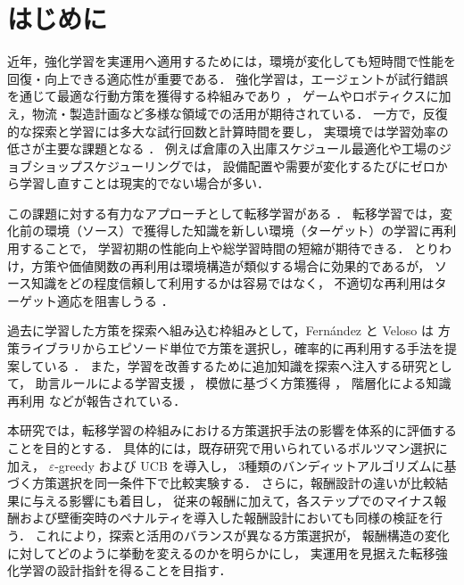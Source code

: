 \section{はじめに}
近年，強化学習を実運用へ適用するためには，環境が変化しても短時間で性能を回復・向上できる適応性が重要である．
強化学習は，エージェントが試行錯誤を通じて最適な行動方策を獲得する枠組みであり
\cite{SuttonBarto1998,WatkinsDayan1992}，
ゲームやロボティクスに加え，物流・製造計画など多様な領域での活用が期待されている．
一方で，反復的な探索と学習には多大な試行回数と計算時間を要し，
実環境では学習効率の低さが主要な課題となる
\cite{Thrun1995}．
例えば倉庫の入出庫スケジュール最適化や工場のジョブショップスケジューリングでは，
設備配置や需要が変化するたびにゼロから学習し直すことは現実的でない場合が多い．

この課題に対する有力なアプローチとして転移学習がある
\cite{TaylorWhitesonStone2007}．
転移学習では，変化前の環境（ソース）で獲得した知識を新しい環境（ターゲット）の学習に再利用することで，
学習初期の性能向上や総学習時間の短縮が期待できる．
とりわけ，方策や価値関数の再利用は環境構造が類似する場合に効果的であるが，
ソース知識をどの程度信頼して利用するかは容易ではなく，
不適切な再利用はターゲット適応を阻害しうる
\cite{TaylorKuhlmannStone2008}．

過去に学習した方策を探索へ組み込む枠組みとして，Fern\'andez と Veloso は
方策ライブラリからエピソード単位で方策を選択し，確率的に再利用する手法を提案している
\cite{Fernandez2006}．
また，学習を改善するために追加知識を探索へ注入する研究として，
助言ルールによる学習支援
\cite{MaclinShavlik1996}，
模倣に基づく方策獲得
\cite{NicolescuMataric2003}，
階層化による知識再利用
\cite{BartoMahadevan2003,KonidarisBarto2007}
などが報告されている．

本研究では，転移学習の枠組みにおける方策選択手法の影響を体系的に評価することを目的とする．
具体的には，既存研究で用いられているボルツマン選択に加え，
$\varepsilon$-greedy および UCB を導入し，
3種類のバンディットアルゴリズムに基づく方策選択を同一条件下で比較実験する．
さらに，報酬設計の違いが比較結果に与える影響にも着目し，
従来の報酬に加えて，各ステップでのマイナス報酬および壁衝突時のペナルティを導入した報酬設計においても同様の検証を行う．
これにより，探索と活用のバランスが異なる方策選択が，
報酬構造の変化に対してどのように挙動を変えるのかを明らかにし，
実運用を見据えた転移強化学習の設計指針を得ることを目指す．

